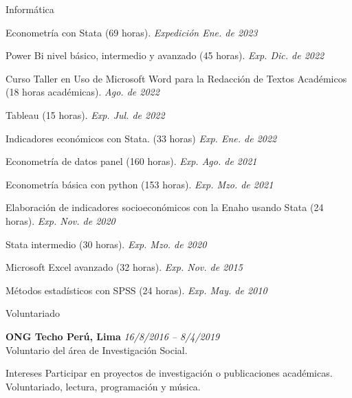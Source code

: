 \documentclass[
	11pt, %
]{resume} %
\begin{document}
\begin{rSection}{Informática}
\item Econometría con Stata (69 horas). \hfill \textit{Expedición Ene. de 2023} \
\item Power Bi nivel básico, intermedio y avanzado (45 horas). \hfill \textit{Exp. Dic. de 2022}
\item Curso Taller en Uso de Microsoft Word para la Redacción de Textos Académicos (18 horas académicas). \hfill \textit{Ago. de 2022} \ 
\item Tableau (15 horas). \hfill \textit{Exp. Jul. de 2022}
\item Indicadores económicos con Stata. (33 horas) \hfill \textit{Exp. Ene. de 2022} 
\item Econometría de datos panel (160 horas). \hfill \textit{Exp. Ago. de 2021}
\item Econometría básica con python (153 horas). \hfill \textit{Exp. Mzo. de 2021}
\item Elaboración de indicadores socioeconómicos con la Enaho usando Stata (24 horas). \hfill \textit{Exp. Nov. de 2020}
\item Stata intermedio (30 horas). \hfill \textit{Exp. Mzo. de 2020}
\item Microsoft Excel avanzado (32 horas). \hfill \textit{Exp. Nov. de 2015}
\item Métodos estadísticos con SPSS (24 horas).  \hfill \textit{Exp. May. de 2010} \
	
	\end{rSection}
	


\begin{rSection}{Voluntariado}
	
	\textbf{ONG Techo Perú, Lima} \hfill \textit{16/8/2016 – 8/4/2019} \\ 
	Voluntario del área de Investigación Social. 
\end{rSection}

\begin{rSection}{Intereses}
Participar en proyectos de investigación o publicaciones académicas. Voluntariado, lectura, programación y música.
\end{rSection}	
\end{document}
